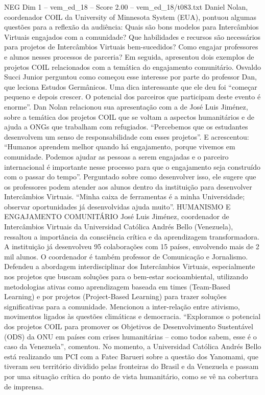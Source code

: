 \begin{textsample}{NEG Dim 1 – vem\_ed\_18 – Score 2.00 – vem\_ed\_18/t083.txt}  \label{ex:f1_neg_063}
Daniel Nolan, coordenador COIL da University of Minnesota System (EUA), pontuou algumas questões para a reflexão da audiência: Quais são bons modelos para Intercâmbios Virtuais engajados com a comunidade?
Que habilidades e recursos são necessários para projetos de Intercâmbios Virtuais bem-sucedidos?
Como engajar professores e alunos nesses processos de parceria?
Em seguida, apresentou dois exemplos de projetos COIL relacionados com a temática do engajamento comunitário.
Osvaldo Succi Junior perguntou como começou esse interesse por parte do professor Dan, que leciona Estudos Germânicos.
Uma dica interessante que ele deu foi “começar pequeno e depois crescer.
O potencial dos parceiros que participam deste evento é enorme”.
Dan Nolan relacionou sua apresentação com a de José Luis Jiménez, sobre a temática dos projetos COIL que se voltam a aspectos humanitários e de ajuda a ONGs que trabalham com refugiados. “Percebemos que os estudantes desenvolvem um senso de responsabilidade com esses projetos”.
E acrescentou: “Humanos aprendem melhor quando há engajamento, porque vivemos em comunidade.
Podemos ajudar as pessoas a serem engajadas e o parceiro internacional é importante nesse processo para que o engajamento seja construído com o passar do tempo”.
Perguntado sobre como desenvolver isso, ele sugere que os professores podem atender aos alunos dentro da instituição para desenvolver Intercâmbios Virtuais. “Minha caixa de ferramentas é a minha Universidade; observar oportunidades já desenvolvidas ajuda muito”.
HUMANISMO E ENGAJAMENTO COMUNITÁRIO José Luis Jiménez, coordenador de Intercâmbios Virtuais da Universidad Católica Andrés Bello (Venezuela), ressaltou a importância da consciência crítica e da aprendizagem transformadora.
A instituição já desenvolveu 95 colaborações com 15 países, envolvendo mais de 2 mil alunos.
O coordenador é também professor de Comunicação e Jornalismo.
Defendeu a abordagem interdisciplinar dos Intercâmbios Virtuais, especialmente nos projetos que buscam soluções para o bem-estar socioambiental, utilizando metodologias ativas como aprendizagem baseada em times (Team-Based Learning) e por projetos (Project-Based Learning) para trazer soluções significativas para a comunidade.
Mencionou a inter-relação entre ativismo, movimentos ligados às questões climáticas e democracia. “Exploramos o potencial dos projetos COIL para promover os Objetivos de Desenvolvimento Sustentável (ODS) da ONU em países com crises humanitárias – como todos sabem, esse é o caso da Venezuela”, comentou.
No momento, a Universidad Católica Andrés Bello está realizando um PCI com a Fatec Barueri sobre a questão dos Yanomami, que tiveram seu território dividido pelas fronteiras do Brasil e da Venezuela e passam por uma situação crítica do ponto de vista humanitário, como se vê na cobertura de imprensa.

\end{textsample}
